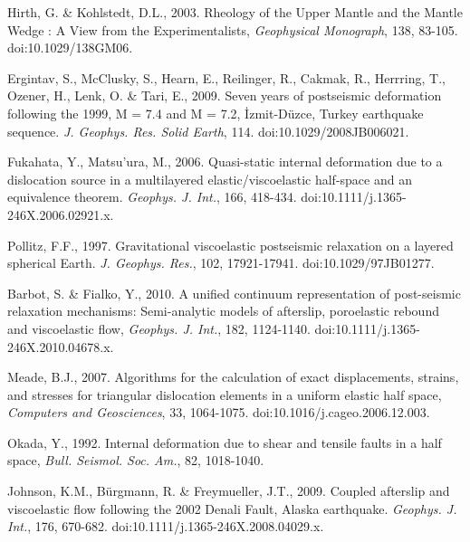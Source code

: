\documentclass[extra]{gji}
\begin{document}
\begin{thebibliography}{}

 Hirth, G. \&
  Kohlstedt, D.L., 2003. Rheology of the Upper Mantle and the Mantle
  Wedge : A View from the Experimentalists, \textit{Geophysical
    Monograph}, 138, 83-105. doi:10.1029/138GM06.

 Ergintav, S.,
  McClusky, S., Hearn, E., Reilinger, R., Cakmak, R., Herrring, T.,
  Ozener, H., Lenk, O. \& Tari, E., 2009. Seven years of postseismic
  deformation following the 1999, M = 7.4 and M = 7.2,
  \.Izmit-D\"uzce, Turkey earthquake
  sequence. \textit{J. Geophys. Res. Solid Earth},
  114. doi:10.1029/2008JB006021.

 Fukahata, Y.,
  Matsu’ura, M., 2006. Quasi-static internal deformation due to a
  dislocation source in a multilayered elastic/viscoelastic half-space
  and an equivalence theorem. \textit{Geophys. J. Int.}, 166,
  418-434. doi:10.1111/j.1365-246X.2006.02921.x.

 Pollitz, F.F.,
  1997. Gravitational viscoelastic postseismic relaxation on a layered
  spherical Earth. \textit{J. Geophys. Res.}, 102,
  17921-17941. doi:10.1029/97JB01277.

 Barbot, S. \&
  Fialko, Y., 2010. A unified continuum representation of post-seismic
  relaxation mechanisms: Semi-analytic models of afterslip,
  poroelastic rebound and viscoelastic flow, \textit{Geophys. J.
    Int.}, 182, 1124-1140. doi:10.1111/j.1365-246X.2010.04678.x.

 Meade, B.J., 2007. Algorithms for the
  calculation of exact displacements, strains, and stresses for
  triangular dislocation elements in a uniform elastic half space,
  \textit{Computers and Geosciences}, 33,
  1064-1075. doi:10.1016/j.cageo.2006.12.003.

 Okada, Y., 1992. Internal
  deformation due to shear and tensile faults in a half space,
  \textit{Bull. Seismol. Soc.  Am.}, 82, 1018-1040.

Johnson, K.M.,
  B\"urgmann, R. \& Freymueller, J.T., 2009. Coupled afterslip and
  viscoelastic flow following the 2002 Denali Fault, Alaska
  earthquake. \textit{Geophys. J.  Int.}, 176,
  670-682. doi:10.1111/j.1365-246X.2008.04029.x.


\end{thebibliography}
\end{document}
